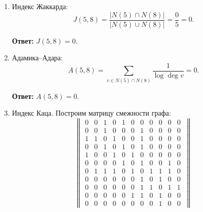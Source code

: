 \documentclass[12pt, a4paper]{extarticle}
\newcommand{\Answer}[1]{\textbf{Ответ:} #1 \\}
\begin{document}
\begin{enumerate}
    \item Индекс Жаккарда:
        \begin{equation}
            J(5, 8) = \frac{|N(5) \cap N(8)|}{|N(5) \cup N(8)|} = \frac{0}{5} = 0.
        \end{equation}
        
        \Answer{$J(5, 8) = 0$.}
        
    \item Адамика–Адара:
        \begin{equation}
            A(5, 8) = \sum_{v \in N(5) \cap N(8)} \frac{1}{\log \deg v} = 0.
        \end{equation}
        
        \Answer{$A(5, 8) = 0$.}
        
    \item Индекс Каца. Построим матрицу смежности графа:
        \begin{equation}
            \begin{Vmatrix}
                0 & 0 & 1 & 0 & 1 & 0 & 0 & 0 & 0 & 0 & 0 \\
                0 & 0 & 1 & 0 & 0 & 0 & 1 & 0 & 0 & 0 & 0 \\
                1 & 1 & 0 & 1 & 0 & 0 & 1 & 0 & 0 & 0 & 0 \\
                0 & 0 & 1 & 0 & 1 & 0 & 1 & 0 & 0 & 0 & 0 \\
                1 & 0 & 0 & 1 & 0 & 1 & 0 & 0 & 0 & 0 & 0 \\
                0 & 0 & 0 & 0 & 1 & 0 & 1 & 0 & 0 & 1 & 0 \\
                0 & 1 & 1 & 1 & 0 & 1 & 0 & 1 & 1 & 1 & 0 \\
                0 & 0 & 0 & 0 & 0 & 0 & 1 & 0 & 1 & 0 & 0 \\
                0 & 0 & 0 & 0 & 0 & 0 & 1 & 1 & 0 & 1 & 1 \\
                0 & 0 & 0 & 0 & 0 & 1 & 1 & 0 & 1 & 0 & 0 \\
                0 & 0 & 0 & 0 & 0 & 0 & 0 & 0 & 1 & 0 & 0 \
            \end{Vmatrix}
        \end{equation}
        

\end{enumerate}
\end{document}
